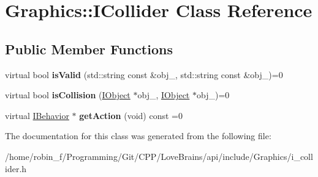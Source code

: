 \hypertarget{class_graphics_1_1_i_collider}{}\section{Graphics\+:\+:I\+Collider Class Reference}
\label{class_graphics_1_1_i_collider}
\subsection*{Public Member Functions}
\begin{DoxyCompactItemize}
\item 
\hypertarget{class_graphics_1_1_i_collider_a7a9174231a3590a6283a6577d3d00af4}{}virtual bool {\bfseries is\+Valid} (std\+::string const \&obj\+\_, std\+::string const \&obj\+\_)=0\label{class_graphics_1_1_i_collider_a7a9174231a3590a6283a6577d3d00af4}

\item 
\hypertarget{class_graphics_1_1_i_collider_aee43552fc9e6b45f616b1220a2053971}{}virtual bool {\bfseries is\+Collision} (\hyperlink{class_graphics_1_1_i_object}{I\+Object} $\ast$obj\+\_, \hyperlink{class_graphics_1_1_i_object}{I\+Object} $\ast$obj\+\_)=0\label{class_graphics_1_1_i_collider_aee43552fc9e6b45f616b1220a2053971}

\item 
\hypertarget{class_graphics_1_1_i_collider_a80c81a8f9f1212f1053a0613f0f4d943}{}virtual \hyperlink{class_graphics_1_1_i_behavior}{I\+Behavior} $\ast$ {\bfseries get\+Action} (void) const  =0\label{class_graphics_1_1_i_collider_a80c81a8f9f1212f1053a0613f0f4d943}

\end{DoxyCompactItemize}


The documentation for this class was generated from the following file\+:\begin{DoxyCompactItemize}
\item 
/home/robin\+\_\+f/\+Programming/\+Git/\+C\+P\+P/\+Love\+Brains/api/include/\+Graphics/i\+\_\+collider.\+h\end{DoxyCompactItemize}
